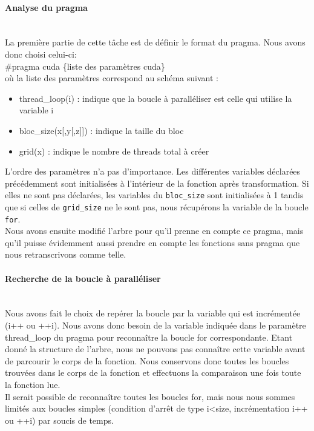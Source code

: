 \documentclass{article}
\begin{document}
	\paragraph{Analyse du pragma}
	~~\\
	\indent
	La première partie de cette tâche est de définir le format du pragma. Nous avons donc choisi celui-ci:
	\\\#pragma cuda \{liste des paramètres cuda\}
	\\où la liste des paramètres correspond au schéma suivant :
	\begin{itemize}
		\item thread\_loop(i) : indique que la boucle à paralléliser est celle qui utilise la variable i
		\item bloc\_size(x[,y[,z]]) : indique la taille du bloc
		\item grid(x) : indique le nombre de threads total à créer
	\end{itemize}
	L'ordre des paramètres n'a pas d'importance.
	Les différentes variables déclarées précédemment sont initialisées à l'intérieur de la fonction après transformation.
	Si elles ne sont pas déclarées, les variables du \verb|bloc_size| sont initialisées à 1 tandis que si celles de \verb|grid_size| ne le sont pas, nous récupérons la variable de la boucle \verb|for|.
	\\Nous avons ensuite modifié l'arbre pour qu'il prenne en compte ce pragma, mais qu'il puisse évidemment aussi prendre en compte les fonctions sans pragma que nous retranscrivons comme telle.
	
	
	\paragraph{Recherche de la boucle à paralléliser}
	~~\\
	\indent
	Nous avons fait le choix de repérer la boucle par la variable qui est incrémentée (i++ ou ++i). Nous avons donc besoin de la variable indiquée dans le paramètre thread\_loop du pragma pour reconnaître la boucle for correspondante. Etant donné la structure de l'arbre, nous ne pouvons pas connaître cette variable avant de parcourir le corps de la fonction. Nous conservons donc toutes les boucles trouvées dans le corps de la fonction et effectuons la comparaison une fois toute la fonction lue.
	\\Il serait possible de reconnaître toutes les boucles for, mais nous nous sommes limités aux boucles simples (condition d'arrêt de type i\textless size, incrémentation i++ ou ++i) par soucis de temps.
	
\end{document}
